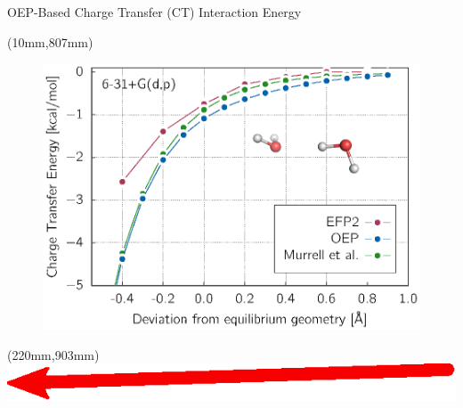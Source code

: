 \documentclass[final]{beamer} %
\begin{document}
\begin{frame}{OEP-Based Charge Transfer (CT) Interaction Energy}
\begin{textblock*}{340mm}(10mm,807mm)
\begin{figure}
\includegraphics[width=1.0\textwidth]{fig-1-s.eps}
\end{figure}
\end{textblock*}

\begin{textblock*}{60mm}(220mm,903mm)
\includegraphics[scale=0.37]{arrow.eps}
\end{textblock*}


\end{frame}
\end{document}
